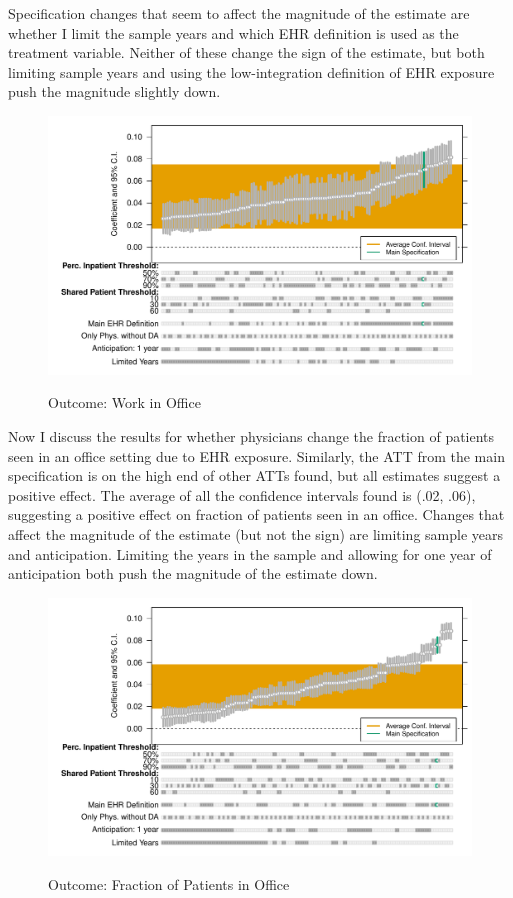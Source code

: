 \documentclass[12pt]{article}
\begin{document}
Specification changes that seem to affect the magnitude of the estimate are whether I limit the sample years and which EHR definition is used as the treatment variable. Neither of these change the sign of the estimate, but both limiting sample years and using the low-integration definition of EHR exposure push the magnitude slightly down.  

\begin{figure}[ht]
    \centering
    \caption{Outcome: Work in Office}
    \includegraphics[scale=.6]{Objects/office_ind_chart.pdf}
    \label{fig:work_chart}
\end{figure}

Now I discuss the results for whether physicians change the fraction of patients seen in an office setting due to EHR exposure. Similarly, the ATT from the main specification is on the high end of other ATTs found, but all estimates suggest a positive effect. The average of all the confidence intervals found is (.02, .06), suggesting a positive effect on fraction of patients seen in an office. Changes that affect the magnitude of the estimate (but not the sign) are limiting sample years and anticipation. Limiting the years in the sample and allowing for one year of anticipation both push the magnitude of the estimate down. 

\begin{figure}[ht]
    \centering
    \caption{Outcome: Fraction of Patients in Office}
    \includegraphics[scale=.6]{Objects/office_frac_chart.pdf}
    \label{fig:fracoffice_chart}
\end{figure}
\end{document}
